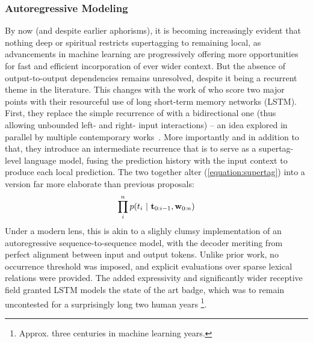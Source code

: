 \subsubsection{Autoregressive Modeling}
By now (and despite earlier aphorisms), it is becoming increasingly evident that nothing deep or spiritual restricts supertagging to remaining local, as advancements in machine learning are progressively offering more opportunities for fast and efficient incorporation of ever wider context.
But the absence of output-to-output dependencies remains unresolved, despite it being a recurrent theme in the literature.
This changes with the work of \citet{vaswani-etal-2016-supertagging} who score two major points with their resourceful use of long short-term memory networks (LSTM).
First, they replace the simple recurrence of \citet{xu-etal-2015-ccg} with a bidirectional one (thus allowing unbounded left- and right- input interactions) --  an idea explored in parallel by multiple contemporary works~\cite[\textit{inter alia}]{ling-etal-2015-finding,xu-etal-2016-expected,lewis-etal-2016-lstm}.
More importantly and in addition to that, they introduce an intermediate recurrence that is to serve as a supertag-level language model, fusing the prediction history with the input context to produce each local prediction.
The two together alter (\ref{equation:supertag}) into a version far more elaborate than previous proposals:
\begin{equation}\label{equation:lstm_lm}
	\prod_i^n p(t_i \ | \ \mathbf{t}_{0:i-1},\mathbf{w}_{0:n})
\end{equation}
Under a modern lens, this is akin to a slighly clumsy implementation of an autoregressive sequence-to-sequence model, with the decoder meriting from perfect alignment between input and output tokens.
Unlike prior work, no occurrence threshold was imposed, and explicit evaluations over sparse lexical relations were provided.
The added expressivity and significantly wider receptive field granted LSTM models the state of the art badge, which was to remain uncontested for a surprisingly long two human years%
	\footnote{Approx. three centuries in machine learning years.}.

